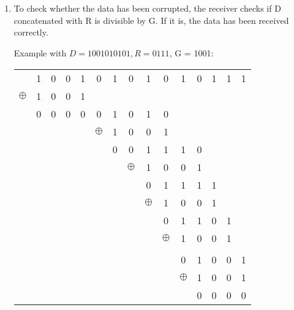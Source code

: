 \documentclass[12pt, a4paper]{article}
\begin{document}
\section{} %
\begin{enumerate}[a]
	\item %
	To check whether the data has been corrupted, the receiver checks if D concatenated with R is divisible by G. If it is, the data has been received correctly.

	Example with $D = 1001010101, R = 0111$, G = 1001:

	\begin{tabular}{ccccccccccccccc}
		& 1 & 0 & 0 & 1 & 0 & 1 & 0 & 1 & 0 & 1 & 0 & 1 & 1 & 1\\
		$\oplus$ & 1 & 0 & 0 & 1\\\cline{2-5}
		& 0 & 0 & 0 & 0 & 0 & 1 & 0 & 1 & 0\\
		&&&&& $\oplus$ & 1 & 0 & 0 & 1\\\cline{7-10}
		&&&&&& 0 & 0 & 1 & 1 & 1 & 0\\
		&&&&&&& $\oplus$ & 1 & 0 & 0 & 1\\\cline{9-12}
		&&&&&&&& 0 & 1 & 1 & 1 & 1\\
		&&&&&&&& $\oplus$ & 1 & 0 & 0 & 1\\\cline{10-13}
		&&&&&&&&& 0 & 1 & 1 & 0 & 1\\
		&&&&&&&&& $\oplus$ & 1 & 0 & 0 & 1\\\cline{11-14}
		&&&&&&&&&& \\
		&&&&&&&&&& 0 & 1 & 0 & 0 & 1\\
		&&&&&&&&&& $\oplus$ & 1 & 0 & 0 & 1\\\cline{12-15}
		&&&&&&&&&&& 0 & 0 & 0 & 0\\
	\end{tabular}


\end{enumerate}
\end{document}
